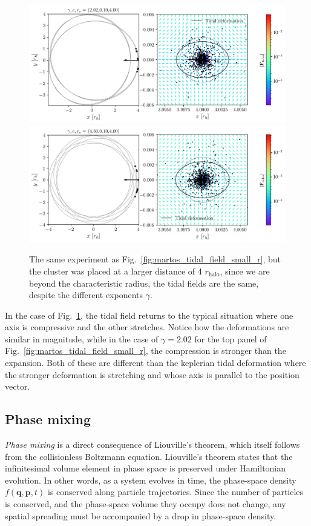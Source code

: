             \begin{figure}
                \includegraphics[width=\linewidth]{images/martos_tidal_field_202_10_400.png}
                \includegraphics[width=\linewidth]{images/martos_tidal_field_450_10_400.png}
                \caption{The same experiment as Fig.~\ref{fig:martos_tidal_field_small_r}, but the cluster was placed at a larger distance of 4 $r_\textrm{halo}$, since we are beyond the characteristic radius, the tidal fields are the same, despite the different exponents $\gamma$.}
                \label{fig:martos_tidal_field_big_r}
            \end{figure}

            In the case of Fig.~\ref{fig:martos_tidal_field_big_r}, the tidal field returns to the typical situation where one axis is compressive and the other stretches. Notice how the deformations are similar in magnitude, while in the case of $\gamma=2.02$ for the top panel of Fig.~\ref{fig:martos_tidal_field_small_r}, the compression is stronger than the expansion. Both of these are different than the keplerian tidal deformation where the stronger deformation is stretching and whose axis is parallel to the position vector. 






    \subsection{Phase mixing}
        \textit{Phase mixing} is a direct consequence of Liouville’s theorem, which itself follows from the collisionless Boltzmann equation. Liouville’s theorem states that the infinitesimal volume element in phase space is preserved under Hamiltonian evolution. In other words, as a system evolves in time, the phase-space density \( f(\mathbf{q}, \mathbf{p}, t) \) is conserved along particle trajectories. Since the number of particles is conserved, and the phase-space volume they occupy does not change, any spatial spreading must be accompanied by a drop in phase-space density.

